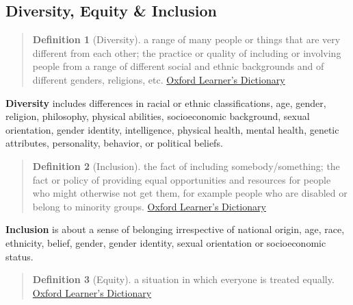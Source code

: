 \documentclass[
]{book}
\theoremstyle{definition}
\newtheorem{definition}{Definition}[chapter]
\theoremstyle{definition}
\theoremstyle{definition}
\theoremstyle{definition}
\theoremstyle{remark}
\begin{document}
\hypertarget{diversity-equity-inclusion}{%
\subsection{Diversity, Equity \& Inclusion}\label{diversity-equity-inclusion}}

\begin{quote}
\begin{definition}[Diversity]
\protect\hypertarget{def:diversity}{}\label{def:diversity}a range of many people or things that are very different from each other; the practice or quality of including or involving people from a range of different social and ethnic backgrounds and of different genders, religions, etc. \href{https://www.oxfordlearnersdictionaries.com/definition/english/diversity}{Oxford Learner's Dictionary}
\end{definition}
\end{quote}

\textbf{Diversity} includes differences in racial or ethnic classifications, age, gender, religion, philosophy, physical abilities, socioeconomic background, sexual orientation, gender identity, intelligence, physical health, mental health, genetic attributes, personality, behavior, or political beliefs.

\begin{quote}
\begin{definition}[Inclusion]
\protect\hypertarget{def:inclusion}{}\label{def:inclusion}the fact of including somebody/something; the fact or policy of providing equal opportunities and resources for people who might otherwise not get them, for example people who are disabled or belong to minority groups. \href{https://www.oxfordlearnersdictionaries.com/definition/english/inclusion}{Oxford Learner's Dictionary}
\end{definition}
\end{quote}

\textbf{Inclusion} is about a sense of belonging irrespective of national origin, age, race, ethnicity, belief, gender, gender identity, sexual orientation or socioeconomic status.

\begin{quote}
\begin{definition}[Equity]
\protect\hypertarget{def:equity}{}\label{def:equity}a situation in which everyone is treated equally. \href{https://www.oxfordlearnersdictionaries.com/definition/english/equity_1}{Oxford Learner's Dictionary}
\end{definition}
\end{quote}
\end{document}
